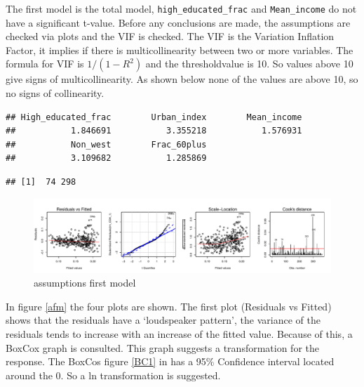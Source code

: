 \documentclass[11pt,]{article}
\begin{document}
The first model is the total model, \texttt{high\_educated\_frac} and
\texttt{Mean\_income} do not have a significant t-value. Before any
conclusions are made, the assumptions are checked via plots and the VIF
is checked. The VIF is the Variation Inflation Factor, it implies if
there is multicollinearity between two or more variables. The formula
for VIF is \(1/(1-R^2)\) and the thresholdvalue is 10. So values above
10 give signs of multicollinearity. As shown below none of the values
are above 10, so no signs of collinearity.

\begin{verbatim}
## High_educated_frac        Urban_index        Mean_income 
##           1.846691           3.355218           1.576931 
##           Non_west        Frac_60plus 
##           3.109682           1.285869
\end{verbatim}

\begin{verbatim}
## [1]  74 298
\end{verbatim}

\begin{figure}[H]

{\centering \includegraphics{lm_part_report_files/figure-latex/unnamed-chunk-1-1} 

}

\caption{\label{afm}assumptions first model}\label{fig:unnamed-chunk-1}
\end{figure}

In figure \ref{afm} the four plots are shown. The first plot (Residuals
vs Fitted) shows that the residuals have a `loudspeaker pattern', the
variance of the residuals tends to increase with an increase of the
fitted value. Because of this, a BoxCox graph is consulted. This graph
suggests a transformation for the response. The BoxCos figure \ref{BC1}
in has a 95\% Confidence interval located around the 0. So a ln
transformation is suggested.
\end{document}
